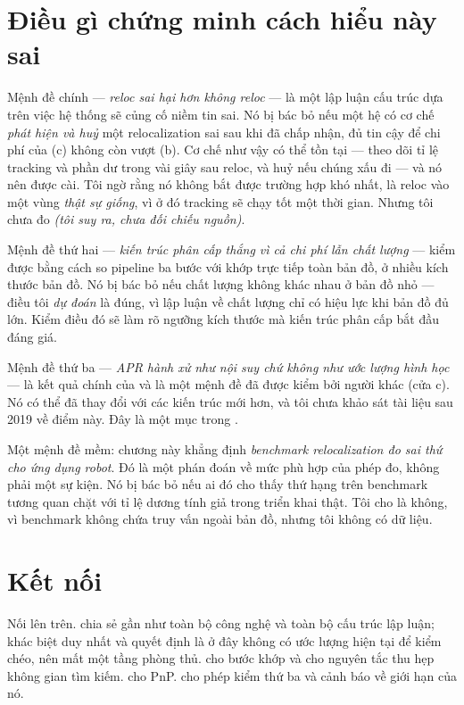 \documentclass[../../vslam.tex]{subfiles}
\begin{document}
\section{Điều gì chứng minh cách hiểu này sai}

Mệnh đề chính --- \emph{reloc sai hại hơn không reloc} --- là một lập luận cấu trúc dựa trên việc hệ thống sẽ củng cố niềm tin sai. Nó bị bác bỏ nếu một hệ có cơ chế \emph{phát hiện và huỷ} một relocalization sai sau khi đã chấp nhận, đủ tin cậy để chi phí của (c) không còn vượt (b). Cơ chế như vậy có thể tồn tại --- theo dõi tỉ lệ tracking và phần dư trong vài giây sau reloc, và huỷ nếu chúng xấu đi --- và nó nên được cài. Tôi ngờ rằng nó không bắt được trường hợp khó nhất, là reloc vào một vùng \emph{thật sự giống}, vì ở đó tracking sẽ chạy tốt một thời gian. Nhưng tôi chưa đo \emph{(tôi suy ra, chưa đối chiếu nguồn)}.

Mệnh đề thứ hai --- \emph{kiến trúc phân cấp thắng vì cả chi phí lẫn chất lượng} --- kiểm được bằng cách so pipeline ba bước với khớp trực tiếp toàn bản đồ, ở nhiều kích thước bản đồ. Nó bị bác bỏ nếu chất lượng không khác nhau ở bản đồ nhỏ --- điều tôi \emph{dự đoán} là đúng, vì lập luận về chất lượng chỉ có hiệu lực khi bản đồ đủ lớn. Kiểm điều đó sẽ làm rõ ngưỡng kích thước mà kiến trúc phân cấp bắt đầu đáng giá.

Mệnh đề thứ ba --- \emph{APR hành xử như nội suy chứ không như ước lượng hình học} --- là kết quả chính của \cite{sattler2019understanding} và là một mệnh đề đã được kiểm bởi người khác (cửa c). Nó có thể đã thay đổi với các kiến trúc mới hơn, và tôi chưa khảo sát tài liệu sau 2019 về điểm này. Đây là một mục trong .

Một mệnh đề mềm: chương này khẳng định \emph{benchmark relocalization đo sai thứ cho ứng dụng robot}. Đó là một phán đoán về mức phù hợp của phép đo, không phải một sự kiện. Nó bị bác bỏ nếu ai đó cho thấy thứ hạng trên benchmark tương quan chặt với tỉ lệ dương tính giả trong triển khai thật. Tôi cho là không, vì benchmark không chứa truy vấn ngoài bản đồ, nhưng tôi không có dữ liệu.

\section{Kết nối}

Nối lên trên.  chia sẻ gần như toàn bộ công nghệ và toàn bộ cấu trúc lập luận; khác biệt duy nhất và quyết định là ở đây không có ước lượng hiện tại để kiểm chéo, nên mất một tầng phòng thủ.  cho bước khớp và cho nguyên tắc thu hẹp không gian tìm kiếm.  cho PnP.  cho phép kiểm thứ ba và cảnh báo về giới hạn của nó.
\end{document}
